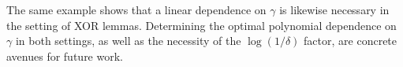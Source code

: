\documentclass[11pt]{article}
\newcommand{\lnote}[1]{\footnote{{\bf \color{blue}Li-Yang}: {#1}}}
\newcommand{\violet}[1]{{\color{violet}{#1}}}
\newcommand{\gray}[1]{{\color{gray}{#1}}}
\newcommand{\violet}[1]{{{#1}}}
\begin{document}
The same example shows that a linear dependence on $\gamma$ is likewise necessary in the setting of XOR lemmas.  Determining the optimal polynomial dependence on $\gamma$ in both settings, as well as the necessity of the $\log(1/\delta)$ factor, are concrete avenues for future work. 




\end{document}
